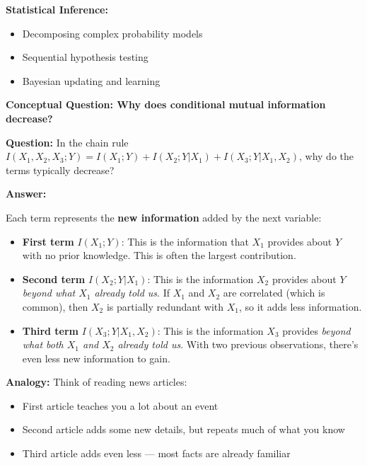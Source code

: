 \documentclass[11pt,a4paper]{book}
\newenvironment{formulabox}[1][Formula]{
    \begin{tcolorbox}[
        enhanced,
        breakable,
        colback=softcoral!10,
        colframe=softcoral!200,
        title=#1,
        fonttitle=\bfseries,
        coltitle=white,
        sharp corners,
        boxrule=1pt,
        left=8pt,
        right=8pt,
        top=6pt,
        bottom=6pt
    ]
}{
    \end{tcolorbox}
}
\newenvironment{infobox}[1][For more understanding]{
    \begin{tcolorbox}[
        enhanced,
        breakable,
        colback=mintgreen!10,
        colframe=mintgreen!200,
        title=#1,
        fonttitle=\bfseries,
        sharp corners,
        boxrule=0.8pt,
        left=8pt,
        right=8pt,
        top=6pt,
        bottom=6pt
    ]
}{
    \end{tcolorbox}
}
\newcounter{qna}[chapter]
\renewcommand{\theqna}{\thechapter.\arabic{qna}}
\newenvironment{questionanswerbox}{
    \refstepcounter{qna}%
    \begin{tcolorbox}[
        enhanced,
        breakable,
        colback=softlavender!10,
        colframe=softlavender!200,
        title={Example~\theqna}, %
        fonttitle=\bfseries,
        coltitle=white,
        colbacktitle=softlavender!200,
        sharp corners,
        boxrule=1pt,
        left=8pt,
        right=8pt,
        top=6pt,
        bottom=6pt
    ]
}{
    \end{tcolorbox}
}
\begin{document}
\begin{formulabox}[General Conditional Chain Rule]
\begin{infobox}[Where Chain Rules Are Used]
    \textbf{Statistical Inference:}
    \begin{itemize}
        \item Decomposing complex probability models
        \item Sequential hypothesis testing
        \item Bayesian updating and learning
    \end{itemize}
\end{infobox}

\begin{questionanswerbox}
    \textbf{Conceptual Question: Why does conditional mutual information decrease?}
    
    \textbf{Question:} In the chain rule \(I(X_1, X_2, X_3; Y) = I(X_1; Y) + I(X_2; Y|X_1) + I(X_3; Y|X_1,X_2)\), why do the terms typically decrease?
    
    \textbf{Answer:}
    
    Each term represents the \textbf{new information} added by the next variable:
    
    \begin{itemize}
        \item \textbf{First term} \(I(X_1; Y)\): This is the information that \(X_1\) provides about \(Y\) with no prior knowledge. This is often the largest contribution.
        
        \item \textbf{Second term} \(I(X_2; Y|X_1)\): This is the information \(X_2\) provides about \(Y\) \emph{beyond what \(X_1\) already told us}. If \(X_1\) and \(X_2\) are correlated (which is common), then \(X_2\) is partially redundant with \(X_1\), so it adds less information.
        
        \item \textbf{Third term} \(I(X_3; Y|X_1,X_2)\): This is the information \(X_3\) provides \emph{beyond what both \(X_1\) and \(X_2\) already told us}. With two previous observations, there's even less new information to gain.
    \end{itemize}
    
    \textbf{Analogy:} Think of reading news articles:
    \begin{itemize}
        \item First article teaches you a lot about an event
        \item Second article adds some new details, but repeats much of what you know
        \item Third article adds even less — most facts are already familiar
    \end{itemize}
    

\end{questionanswerbox}
\end{formulabox}
\end{document}
